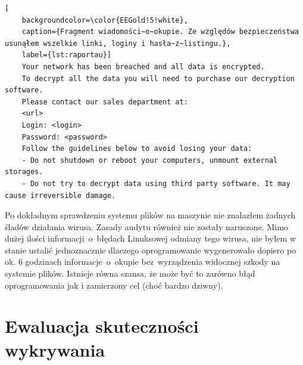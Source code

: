 \begin{lstlisting}[
    backgroundcolor=\color{EEGold!5!white},
    caption={Fragment wiadomości~o~okupie. Ze względów bezpieczeństwa usunąłem wszelkie linki, loginy i hasła~z~listingu.},
    label={lst:raportau}]
    Your network has been breached and all data is encrypted.
    To decrypt all the data you will need to purchase our decryption software.
    Please contact our sales department at:
    <url>
    Login: <login>
    Password: <password>
    Follow the guidelines below to avoid losing your data:
    - Do not shutdown or reboot your computers, unmount external storages.
    - Do not try to decrypt data using third party software. It may cause irreversible damage.
\end{lstlisting}
Po dokładnym sprawdzeniu systemu plików na maszynie nie znalazłem żadnych śladów działania wirusa. Zasady audytu również nie zostały naruszone. Mimo dużej ilości informacji~o~błędach Linuksowej odmiany tego wirusa, nie byłem w stanie ustalić jednoznacznie dlaczego oprogramowanie wygenerowało dopiero po ok. 6 godzinach informacje~o~okupie bez~wyrządzenia widocznej szkody na systemie plików. Istnieje równa szansa, że może być to zarówno błąd oprogramowania jak i zamierzony cel (choć bardzo dziwny).

\section{Ewaluacja skuteczności wykrywania}

